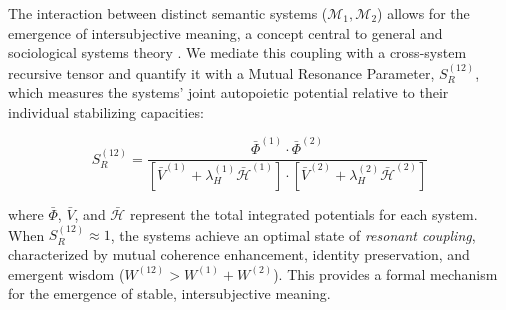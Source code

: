 The interaction between distinct semantic systems (\(\mathcal{M}_1, \mathcal{M}_2\)) allows for the emergence of intersubjective meaning, a concept central to general and sociological systems theory \autocite{vonBertalanffy1968, Luhmann1995}. We mediate this coupling with a cross-system recursive tensor and quantify it with a Mutual Resonance Parameter, \(S_R^{(12)}\), which measures the systems' joint autopoietic potential relative to their individual stabilizing capacities:

\begin{equation}
S_R^{(12)} = \frac{\bar{\Phi}^{(1)} \cdot \bar{\Phi}^{(2)}}{[\bar{V}^{(1)} + \lambda_H^{(1)} \bar{\mathcal{H}}^{(1)}] \cdot [\bar{V}^{(2)} + \lambda_H^{(2)} \bar{\mathcal{H}}^{(2)}]}
\end{equation}

where \(\bar{\Phi}\), \(\bar{V}\), and \(\bar{\mathcal{H}}\) represent the total integrated potentials for each system. When \(S_R^{(12)} \approx 1\), the systems achieve an optimal state of \textit{resonant coupling}, characterized by mutual coherence enhancement, identity preservation, and emergent wisdom (\(W^{(12)} > W^{(1)} + W^{(2)}\)). This provides a formal mechanism for the emergence of stable, intersubjective meaning.